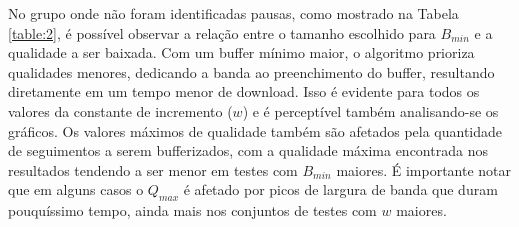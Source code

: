 \documentclass[10pt,twocolumn,letterpaper]{article}
\begin{document}
	No grupo onde não foram identificadas pausas, como mostrado na Tabela \ref{table:2}, é possível observar a relação entre o tamanho escolhido para $B_{min}$ e a qualidade a ser baixada. Com um buffer mínimo maior, o algoritmo prioriza qualidades menores, dedicando a banda ao preenchimento do buffer, resultando diretamente em um tempo menor de download. Isso é evidente para todos os valores da constante de incremento ($w$) e é perceptível também analisando-se os gráficos. Os valores máximos de qualidade também são afetados pela quantidade de seguimentos a serem bufferizados, com a qualidade máxima encontrada nos resultados tendendo a ser menor em testes com $B_{min}$ maiores. É importante notar que em alguns casos o $Q_{max}$ é afetado por picos de largura de banda que duram pouquíssimo tempo, ainda mais nos conjuntos de testes com $w$ maiores. 
	
\end{document}
